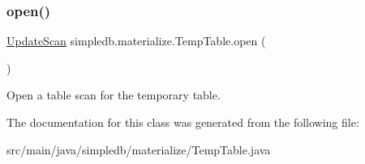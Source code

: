 \subsubsection{\texorpdfstring{open()}{open()}}
{\footnotesize\ttfamily \hyperlink{interfacesimpledb_1_1query_1_1UpdateScan}{Update\+Scan} simpledb.\+materialize.\+Temp\+Table.\+open (\begin{DoxyParamCaption}{ }\end{DoxyParamCaption})\hspace{0.3cm}{\ttfamily [inline]}}

Open a table scan for the temporary table. 

The documentation for this class was generated from the following file\+:\begin{DoxyCompactItemize}
\item 
src/main/java/simpledb/materialize/Temp\+Table.\+java\end{DoxyCompactItemize}
